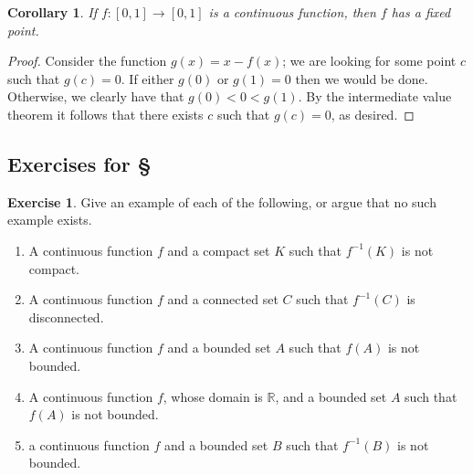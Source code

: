 \documentclass[11pt,oneside]{amsbook}
\newcommand{\R}{\mathbb R}
\theoremstyle{definition}
\newtheorem{exerc}{Exercise}[section]
\theoremstyle{plain}
\newtheorem{corollary}[theorem]{Corollary}
\theoremstyle{definition}
\theoremstyle{remark}
\numberwithin{equation}{section}
\numberwithin{figure}{section}
\begin{document}
\begin{corollary}
  If $f\colon[0,1]\to[0,1]$ is a continuous function, then $f$ has a fixed point.
\end{corollary}

\begin{proof}
  Consider the function $g(x)=x-f(x)$; we are looking for some point $c$ such that $g(c)=0$. If either $g(0)$ or $g(1)=0$ then we would be done. Otherwise, we clearly have that $g(0)<0<g(1)$. By the intermediate value theorem it follows that there exists $c$ such that $g(c)=0$, as desired.
\end{proof}

\newpage
\subsection*{Exercises for \S \thesection}

\begin{exerc}
  Give an example of each of the following, or argue that no such example exists.
  \begin{enumerate}
    \item A continuous function $f$ and a compact set $K$ such that $f^{-1}(K)$ is not compact.
    \item A continuous function $f$ and a connected set $C$ such that $f^{-1}(C)$ is disconnected.
    \item A continuous function $f$ and a bounded set $A$ such that $f(A)$ is not bounded.
    \item A continuous function $f$, whose domain is $\R$, and a bounded set $A$ such that $f(A)$ is not bounded.
    \item a continuous function $f$ and a bounded set $B$ such that $f^{-1}(B)$ is not bounded.
  \end{enumerate}
\end{exerc}
  
\end{document}
